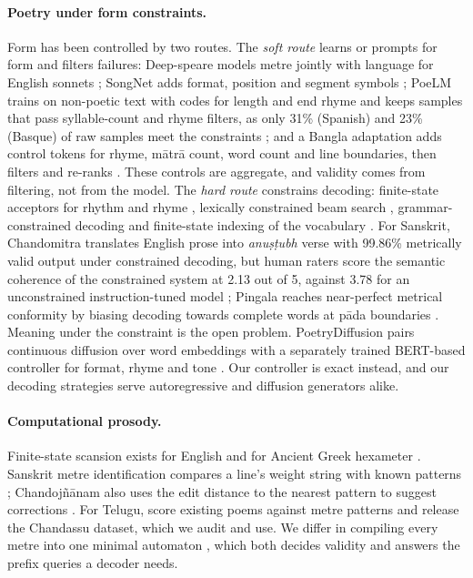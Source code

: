 \documentclass[11pt]{article}
\begin{document}
\paragraph{Poetry under form constraints.} Form has been controlled by two routes. The \emph{soft route}
learns or prompts for form and filters failures: Deep-speare models metre jointly with language for English
sonnets \citep{lau2018deepspeare}; SongNet adds format, position and segment symbols \citep{li2020songnet};
PoeLM trains on non-poetic text with codes for length and end rhyme and keeps samples that pass
syllable-count and rhyme filters, as only 31\% (Spanish) and 23\% (Basque) of raw samples meet the
constraints \citep{ormazabal2022poelm}; and a Bangla adaptation adds control tokens for rhyme, mātrā count,
word count and line boundaries, then filters and re-ranks \citep{amina2025}. These controls are aggregate,
and validity comes from filtering, not from the model. The \emph{hard route} constrains decoding: finite-state acceptors for rhythm and rhyme
\citep{ghazvininejad2016}, lexically constrained beam search \citep{hokamp2017,lu2021neurologic},
grammar-constrained decoding \citep{geng2023grammar} and finite-state indexing of the vocabulary
\citep{willard2023outlines}. For Sanskrit, Chandomitra translates English prose into \textit{anuṣṭubh}
verse with 99.86\% metrically valid output under constrained decoding, but human raters score the semantic
coherence of the constrained system at 2.13 out of 5, against 3.78 for an unconstrained instruction-tuned
model \citep{jagadeeshan2026chandomitra}; Pingala reaches near-perfect metrical conformity by biasing
decoding towards complete words at pāda boundaries \citep{jagadeeshan2026pingala}. Meaning under the
constraint is the open problem. PoetryDiffusion pairs continuous diffusion over word embeddings with a
separately trained BERT-based controller for format, rhyme and tone \citep{hu2024poetrydiffusion}. Our
controller is exact instead, and our decoding strategies serve autoregressive and diffusion generators alike.

\paragraph{Computational prosody.} Finite-state scansion exists for English \citep{hulden2013zeuscansion}
and for Ancient Greek hexameter \citep{schumann2021hexameter}. Sanskrit metre identification compares a
line's weight string with known patterns \citep{melnad2015,rajagopalan2018user,terdalkar2023};
Chandojñānam also uses the edit distance to the nearest pattern to suggest corrections \citep{terdalkar2023}.
For Telugu, \citet{boddu2025chandassu} score existing poems against metre patterns and release the
Chandassu dataset, which we audit and use. We differ in compiling every metre into one minimal automaton
\citep{rabin1959,moore1956,daciuk2000,blumer1985}, which both decides validity and answers the prefix
queries a decoder needs.
\end{document}
